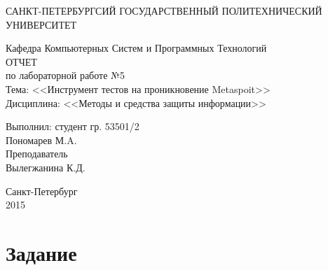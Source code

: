 \documentclass[utf8x, 12pt]{G7-32}
\begin{document}
\frontmatter 


\begin{center} 

\large САНКТ-ПЕТЕРБУРГСИЙ ГОСУДАРСТВЕННЫЙ ПОЛИТЕХНИЧЕСКИЙ УНИВЕРСИТЕТ

\large Кафедра Компьютерных Систем и Программных Технологий \\[5.5cm] 

\huge ОТЧЕТ \\[0.6cm] %
\large по лабораторной работе №5\\
\large Тема: <<Инструмент тестов на проникновение Metaspoit>>\\
\large Дисциплина: <<Методы и средства защиты информации>>\\[3.7cm]

\end{center} 

\begin{flushright}
Выполнил: студент гр. 53501/2 \\
Пономарев М.A. \\[1.2cm]


Преподаватель \\
Вылегжанина К.Д.
\end{flushright}


\vfill 

\begin{center} 
\large Санкт-Петербург \\
2015
\end{center} 

\thispagestyle{empty}



\thispagestyle{empty}
\setcounter{page}{0}
\tableofcontents
\clearpage
\mainmatter


\chapter{Задание}
\end{document}
